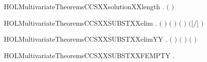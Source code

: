 \newcommand{\HOLMultivariateTheoremsBVXXSUBSETXXBIGUNION}{\UseVerbatim{HOLMultivariateTheoremsBVXXSUBSETXXBIGUNION}}
\begin{SaveVerbatim}{HOLMultivariateTheoremsCCSXXsolutionXXlength}
\HOLTokenTurnstile{} \HOLSymConst{\HOLTokenForall{}}   .
          \HOLSymConst{\HOLTokenConj{}}      \HOLSymConst{\HOLTokenImp{}}
       \ensuremath{(}  \HOLSymConst{\ensuremath{=}}  \ensuremath{)}
\end{SaveVerbatim}
\newcommand{\HOLMultivariateTheoremsCCSXXsolutionXXlength}{\UseVerbatim{HOLMultivariateTheoremsCCSXXsolutionXXlength}}
\begin{SaveVerbatim}{HOLMultivariateTheoremsCCSXXSUBSTXXelim}
\HOLTokenTurnstile{} \HOLSymConst{\HOLTokenForall{}}  .
        \ensuremath{(} \ensuremath{)} \ensuremath{(} \ensuremath{)} \HOLSymConst{\HOLTokenConj{}} \ensuremath{(}  \HOLSymConst{\ensuremath{=}}  \ensuremath{)} \HOLSymConst{\HOLTokenImp{}}
       \ensuremath{(}\ensuremath{[}\ensuremath{/}\ensuremath{]}  \HOLSymConst{\ensuremath{=}} \ensuremath{)}
\end{SaveVerbatim}
\newcommand{\HOLMultivariateTheoremsCCSXXSUBSTXXelim}{\UseVerbatim{HOLMultivariateTheoremsCCSXXSUBSTXXelim}}
\begin{SaveVerbatim}{HOLMultivariateTheoremsCCSXXSUBSTXXelimYY}
\HOLTokenTurnstile{} \HOLSymConst{\HOLTokenForall{}} .  \ensuremath{(} \ensuremath{)} \ensuremath{(} \ensuremath{)} \HOLSymConst{\HOLTokenImp{}} \ensuremath{(}   \HOLSymConst{\ensuremath{=}} \ensuremath{)}
\end{SaveVerbatim}
\newcommand{\HOLMultivariateTheoremsCCSXXSUBSTXXelimYY}{\UseVerbatim{HOLMultivariateTheoremsCCSXXSUBSTXXelimYY}}
\begin{SaveVerbatim}{HOLMultivariateTheoremsCCSXXSUBSTXXFEMPTY}
\HOLTokenTurnstile{} \HOLSymConst{\HOLTokenForall{}}.    \HOLSymConst{\ensuremath{=}} 
\end{SaveVerbatim}
